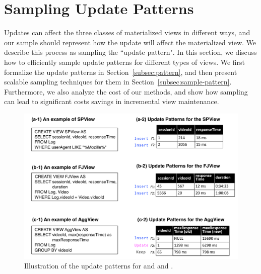 \section{Sampling Update Patterns}
\label{sampling}
Updates can affect the three classes of materialized views in different ways, 
and our sample should represent how the update will affect the materialized view.
We describe this process as sampling the ``update pattern".
In this section, we discuss how to efficiently sample update patterns for different types of views.
We first formalize the update patterns in Section~\ref{subsec:pattern}, and then present scalable sampling techniques for them in Section~\ref{subsec:sample-pattern}. Furthermore, we also analyze the cost of our methods, and show how sampling can lead to significant costs savings in incremental view maintenance.

\begin{figure}[tup]
\centering
 \hspace*{-2em}\includegraphics[scale=0.38]{figs/update-pattern-new.pdf}\vspace{-1em}
 \caption{Illustration of the update patterns for \spview and \fjview and \aggview.}\label{fig:update-pattern}\vspace{-1em}
\end{figure}

